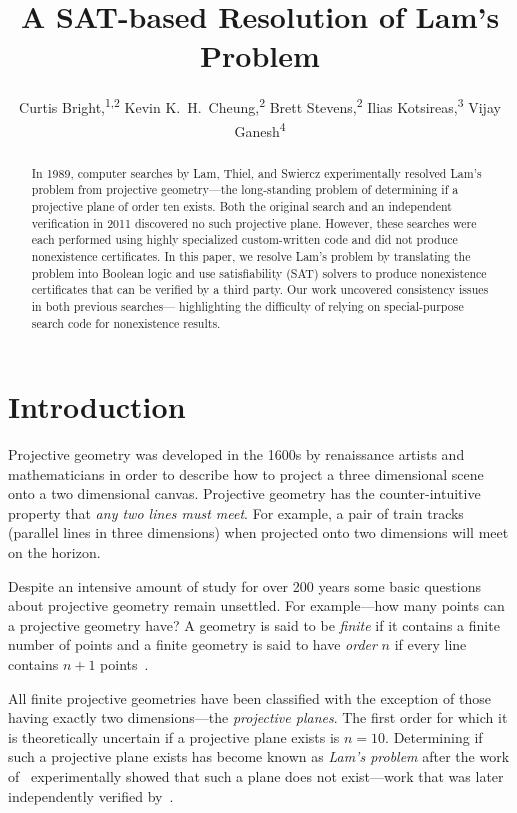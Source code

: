 \documentclass[letterpaper]{article}
\title{A SAT-based Resolution of Lam's Problem}
\author{Curtis Bright,\textsuperscript{\rm 1,2} Kevin K.~H.~Cheung,\textsuperscript{\rm 2} Brett Stevens,\textsuperscript{\rm 2} Ilias Kotsireas,\textsuperscript{\rm 3} Vijay Ganesh\textsuperscript{\rm 4}\\}
\begin{document}
\maketitle
\begin{abstract}
In 1989, computer searches by Lam, Thiel, and Swiercz experimentally
resolved Lam's problem from projective geometry---the
long-standing problem of determining if a projective plane of order
ten exists.  Both the original search and an independent
verification in 2011 discovered no such projective plane.
However, these searches were each performed
using highly specialized custom-written code
and did not produce nonexistence certificates.
In this paper, we resolve Lam's problem by translating
the problem into Boolean logic and use satisfiability
(SAT) solvers to produce nonexistence
certificates that can be verified by a third party.  Our work
uncovered consistency issues in both previous searches---%
highlighting the difficulty of relying on special-purpose search code
for nonexistence results.
\end{abstract}

\section{Introduction}

Projective geometry was developed in the 1600s by renaissance artists
and mathematicians in order to describe how to project a three dimensional
scene onto a two dimensional canvas.  Projective geometry has
the counter-intuitive property that \emph{any two lines
must meet}.  For example, a pair of train
tracks (parallel lines in three dimensions) when projected onto two dimensions
will meet on the horizon.

Despite an intensive amount of study for over 200 years some basic questions
about projective geometry remain unsettled.  For example---how many points
can a projective geometry have?  A geometry is said to be \emph{finite}
if it contains a finite number of points and a finite geometry
is said to have \emph{order} $n$ if every line contains $n+1$ points~\cite{dembowski}.

All finite projective geometries have been classified with the exception
of those having exactly two dimensions---the \emph{projective planes}.
The first order for which it is theoretically uncertain if a projective
plane exists is $n=10$.  Determining if such a projective plane exists has
become known as \emph{Lam's problem} after the work of~\cite{lam1989non}
experimentally showed that such a plane does not exist---work
that was later independently verified by~\cite{roy2011confirmation}.
\end{document}

